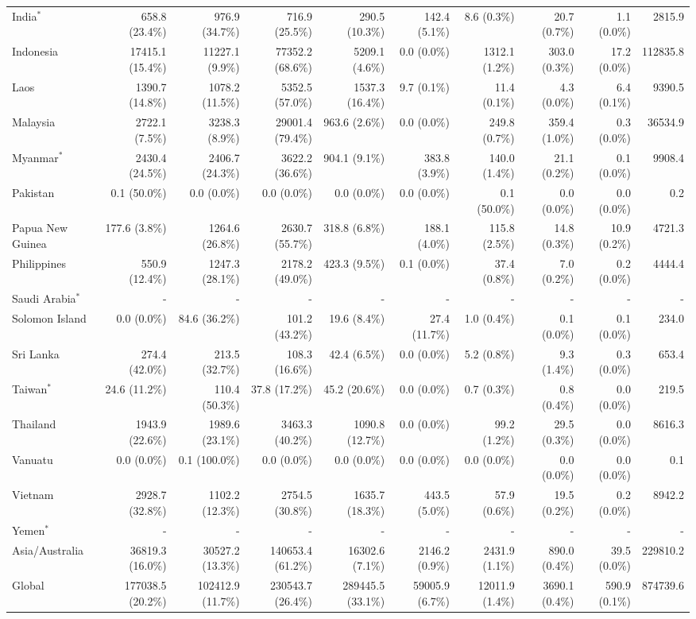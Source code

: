 \begin{scriptsize}
\begin{landscape}
\begin{center}
\begin{longtable}[ht]{lrrrrrrrrr}
			India$^*$&658.8 (23.4\%)&976.9 (34.7\%)&716.9 (25.5\%)&290.5 (10.3\%)&142.4 (5.1\%)&8.6 (0.3\%)&20.7 (0.7\%)&1.1 (0.0\%)&2815.9\\
			Indonesia&17415.1 (15.4\%)&11227.1 (9.9\%)&77352.2 (68.6\%)&5209.1 (4.6\%)&0.0 (0.0\%)&1312.1 (1.2\%)&303.0 (0.3\%)&17.2 (0.0\%)&112835.8\\
			Laos&1390.7 (14.8\%)&1078.2 (11.5\%)&5352.5 (57.0\%)&1537.3 (16.4\%)&9.7 (0.1\%)&11.4 (0.1\%)&4.3 (0.0\%)&6.4 (0.1\%)&9390.5\\
			Malaysia&2722.1 (7.5\%)&3238.3 (8.9\%)&29001.4 (79.4\%)&963.6 (2.6\%)&0.0 (0.0\%)&249.8 (0.7\%)&359.4 (1.0\%)&0.3 (0.0\%)&36534.9\\
			Myanmar$^*$&2430.4 (24.5\%)&2406.7 (24.3\%)&3622.2 (36.6\%)&904.1 (9.1\%)&383.8 (3.9\%)&140.0 (1.4\%)&21.1 (0.2\%)&0.1 (0.0\%)&9908.4\\
			Pakistan&0.1 (50.0\%)&0.0 (0.0\%)&0.0 (0.0\%)&0.0 (0.0\%)&0.0 (0.0\%)&0.1 (50.0\%)&0.0 (0.0\%)&0.0 (0.0\%)&0.2\\
			Papua New Guinea&177.6 (3.8\%)&1264.6 (26.8\%)&2630.7 (55.7\%)&318.8 (6.8\%)&188.1 (4.0\%)&115.8 (2.5\%)&14.8 (0.3\%)&10.9 (0.2\%)&4721.3\\
			Philippines&550.9 (12.4\%)&1247.3 (28.1\%)&2178.2 (49.0\%)&423.3 (9.5\%)&0.1 (0.0\%)&37.4 (0.8\%)&7.0 (0.2\%)&0.2 (0.0\%)&4444.4\\
			Saudi Arabia$^*$&-&-&-&-&-&-&-&-&-\\
			Solomon Island&0.0 (0.0\%)&84.6 (36.2\%)&101.2 (43.2\%)&19.6 (8.4\%)&27.4 (11.7\%)&1.0 (0.4\%)&0.1 (0.0\%)&0.1 (0.0\%)&234.0\\
			Sri Lanka&274.4 (42.0\%)&213.5 (32.7\%)&108.3 (16.6\%)&42.4 (6.5\%)&0.0 (0.0\%)&5.2 (0.8\%)&9.3 (1.4\%)&0.3 (0.0\%)&653.4\\
			Taiwan$^*$&24.6 (11.2\%)&110.4 (50.3\%)&37.8 (17.2\%)&45.2 (20.6\%)&0.0 (0.0\%)&0.7 (0.3\%)&0.8 (0.4\%)&0.0 (0.0\%)&219.5\\
			Thailand&1943.9 (22.6\%)&1989.6 (23.1\%)&3463.3 (40.2\%)&1090.8 (12.7\%)&0.0 (0.0\%)&99.2 (1.2\%)&29.5 (0.3\%)&0.0 (0.0\%)&8616.3\\
			Vanuatu&0.0 (0.0\%)&0.1 (100.0\%)&0.0 (0.0\%)&0.0 (0.0\%)&0.0 (0.0\%)&0.0 (0.0\%)&0.0 (0.0\%)&0.0 (0.0\%)&0.1\\
			Vietnam&2928.7 (32.8\%)&1102.2 (12.3\%)&2754.5 (30.8\%)&1635.7 (18.3\%)&443.5 (5.0\%)&57.9 (0.6\%)&19.5 (0.2\%)&0.2 (0.0\%)&8942.2\\
			Yemen$^*$&-&-&-&-&-&-&-&-&-\\\hline
			Asia/Australia&36819.3 (16.0\%)&30527.2 (13.3\%)&140653.4 (61.2\%)&16302.6 (7.1\%)&2146.2 (0.9\%)&2431.9 (1.1\%)&890.0 (0.4\%)&39.5 (0.0\%)&229810.2\\\hline
			Global&177038.5 (20.2\%)&102412.9 (11.7\%)&230543.7 (26.4\%)&289445.5 (33.1\%)&59005.9 (6.7\%)&12011.9 (1.4\%)&3690.1 (0.4\%)&590.9 (0.1\%)&874739.6\\
			\end{longtable}
		\end{center}
	\end{landscape}
\end{scriptsize}
